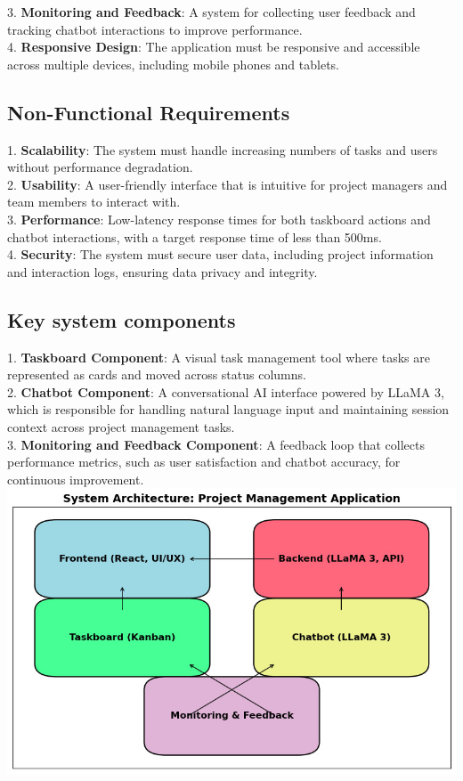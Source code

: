 \documentclass[conference]{IEEEtran}
\begin{document}
	3. \textbf{Monitoring and Feedback}: A system for collecting user feedback and tracking chatbot interactions to improve performance.\\
	
	4. \textbf{Responsive Design}: The application must be responsive and accessible across multiple devices, including mobile phones and tablets.\\
	
	\subsection{Non-Functional Requirements}
	
	1. \textbf{Scalability}: The system must handle increasing numbers of tasks and users without performance degradation.\\
	
	2. \textbf{Usability}: A user-friendly interface that is intuitive for project managers and team members to interact with.\\
	
	3. \textbf{Performance}: Low-latency response times for both taskboard actions and chatbot interactions, with a target response time of less than 500ms.\\
	
	4. \textbf{Security}: The system must secure user data, including project information and interaction logs, ensuring data privacy and integrity.\\
	
	\subsection{Key system components}
	
	
	1. \textbf{Taskboard Component}: A visual task management tool where tasks are represented as cards and moved across status columns. \\
	
	2. \textbf{Chatbot Component}: A conversational AI interface powered by LLaMA 3, which is responsible for handling natural language input and maintaining session context across project management tasks.\\
	
	3. \textbf{Monitoring and Feedback Component}: A feedback loop that collects performance metrics, such as user satisfaction and chatbot accuracy, for continuous improvement.\\
	
	\includegraphics[scale=0.35]{images/grafica.jpg}
	
	
	\begin{thebibliography}{00}
	\end{thebibliography}
	
	
\end{document}
